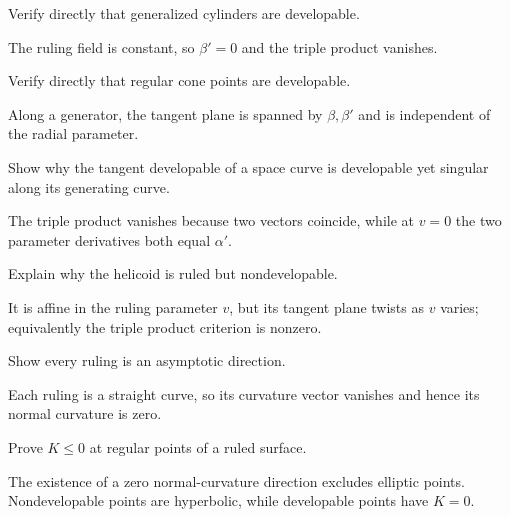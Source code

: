 \begin{problem}\label{prob:vii18-04}
Verify directly that generalized cylinders are developable.
\end{problem}
\begin{solution}
The ruling field is constant, so \(\beta'=0\) and the triple product vanishes.
\end{solution}

\begin{problem}\label{prob:vii18-05}
Verify directly that regular cone points are developable.
\end{problem}
\begin{solution}
Along a generator, the tangent plane is spanned by \(\beta,\beta'\) and is independent of the radial parameter.
\end{solution}

\begin{problem}\label{prob:vii18-06}
Show why the tangent developable of a space curve is developable yet singular along its generating curve.
\end{problem}
\begin{solution}
The triple product vanishes because two vectors coincide, while at \(v=0\) the two parameter derivatives both equal \(\alpha'\).
\end{solution}

\begin{problem}\label{prob:vii18-07}
Explain why the helicoid is ruled but nondevelopable.
\end{problem}
\begin{solution}
It is affine in the ruling parameter \(v\), but its tangent plane twists as \(v\) varies; equivalently the triple product criterion is nonzero.
\end{solution}

\begin{problem}\label{prob:vii18-08}
Show every ruling is an asymptotic direction.
\end{problem}
\begin{solution}
Each ruling is a straight curve, so its curvature vector vanishes and hence its normal curvature is zero.
\end{solution}

\begin{problem}\label{prob:vii18-09}
Prove \(K\le0\) at regular points of a ruled surface.
\end{problem}
\begin{solution}
The existence of a zero normal-curvature direction excludes elliptic points. Nondevelopable points are hyperbolic, while developable points have \(K=0\).
\end{solution}

